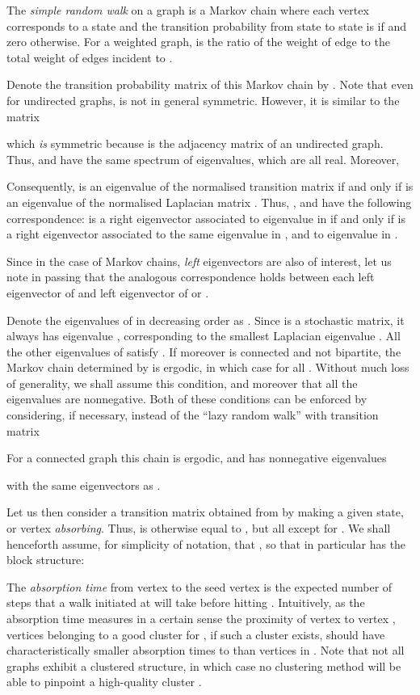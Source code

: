 \documentclass{article}
\begin{document}
The \emph{simple random walk} on a graph  is a Markov chain where
each vertex  corresponds to a state and the transition
probability from state  to state  is  if
 and zero otherwise. For a weighted graph,  is
the ratio of the weight of edge  to the total weight of edges
incident to .

Denote the transition probability matrix of this Markov chain by .  Note that even for undirected graphs,  is not
in general symmetric. However, it is similar to the matrix

which \emph{is} symmetric because  is the adjacency matrix of an
undirected graph. Thus,  and  have the same spectrum of
eigenvalues, which are all real. Moreover,

Consequently,  is an eigenvalue of the normalised transition matrix 
if and only if  is an eigenvalue of the normalised
Laplacian matrix .  Thus, ,  and  have the following
correspondence:  is a right eigenvector associated to eigenvalue  in
 if and only if  is a right eigenvector associated
to the same eigenvalue in , and to eigenvalue  in
.

Since in the case of Markov chains, \emph{left} eigenvectors are also
of interest, let us note in passing that the analogous correspondence
holds between each left eigenvector  of  and left eigenvector
 of  or .

Denote the eigenvalues of  in decreasing order as .  Since  is
a stochastic matrix, it always has eigenvalue ,
corresponding to the smallest Laplacian eigenvalue . All the other eigenvalues of  satisfy . If moreover  is connected and not bipartite, the Markov chain
determined by  is ergodic, in which case 
for all . Without much loss of generality, we shall
assume this condition, and moreover that all the eigenvalues 
are nonnegative. Both of these conditions can be enforced by
considering, if necessary, instead of  the ``lazy random walk''
with transition matrix

For a connected graph  this chain is ergodic, and has
nonnegative eigenvalues

with the same eigenvectors as .

Let us then consider a transition matrix  obtained from 
by making a given state, or vertex  \emph{absorbing}.
Thus,  is otherwise equal to , but all
 except for .
We shall henceforth assume, for simplicity of notation, that
, so that in particular  has the block structure:


The \emph{absorption time}  from vertex  to the seed
vertex  is the expected number of steps that a walk initiated at
 will take before hitting . Intuitively, as the absorption time
measures in a certain sense the proximity of vertex  to vertex ,
vertices belonging to a good cluster  for , if such a cluster
exists, should have characteristically smaller absorption times to 
than vertices in . Note that not all graphs exhibit a
clustered structure, in which case no clustering method will be able
to pinpoint a high-quality cluster \cite{Scha07}.
\end{document}
